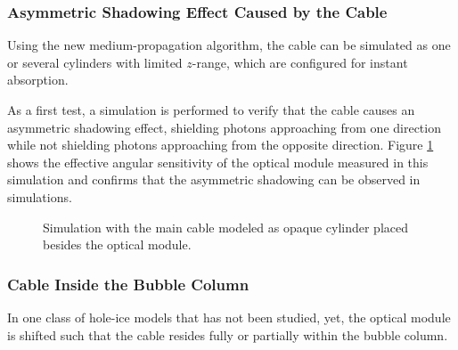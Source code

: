 \subsubsection{Asymmetric Shadowing Effect Caused by the Cable}

Using the new medium-propagation algorithm, the cable can be simulated as one or several cylinders with limited $z$-range, which are configured for instant absorption.

As a first test, a simulation is performed to verify that the cable causes an asymmetric shadowing effect, shielding photons approaching from one direction while not shielding photons approaching from the opposite direction. Figure \ref{fig:ochoCh7o} shows the effective angular sensitivity of the optical module measured in this simulation and confirms that the asymmetric shadowing can be observed in simulations.


\begin{figure}[htbp]
  \hfill
  \caption{Simulation with the main cable modeled as opaque cylinder placed besides the optical module.}
  \label{fig:ochoCh7o}
\end{figure}


\subsubsection{Cable Inside the Bubble Column}


In one class of hole-ice models that has not been studied, yet, the optical module is shifted such that the cable resides fully or partially within the bubble column. \cite{martinspicehddard}

